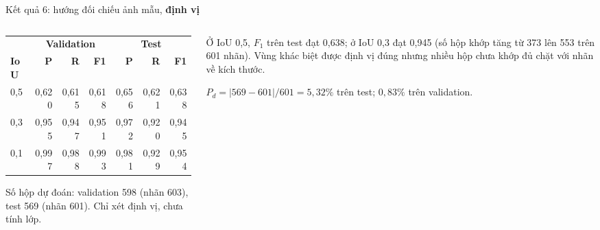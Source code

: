 \documentclass[aspectratio=169,11pt,t]{beamer}
\newcommand{\hl}[1]{{\bfseries\color{coral}#1}}
\newcommand{\hdr}[1]{{\bfseries\color{muted}#1}}
\newcommand{\mynote}[1]{{\color{muted}\footnotesize #1}}
\begin{document}
\begin{frame}{Kết quả 6: hướng đối chiếu ảnh mẫu, \hl{định vị}}
  \begin{columns}[T]
    \begin{column}{0.46\textwidth}
      \footnotesize
      \renewcommand{\arraystretch}{1.3}\setlength{\tabcolsep}{3pt}
      \begin{tabular}{@{}lrrrrrr@{}}
        \toprule
        & \multicolumn{3}{c}{\hdr{Validation}} & \multicolumn{3}{c}{\hdr{Test}} \\
        \cmidrule(lr){2-4}\cmidrule(l){5-7}
        \hdr{IoU} & \hdr{P} & \hdr{R} & \hdr{F1} & \hdr{P} & \hdr{R} & \hdr{F1} \\
        \midrule
        0,5 & 0,620 & 0,615 & 0,618 & 0,656 & 0,621 & 0,638 \\
        0,3 & 0,955 & 0,947 & 0,951 & 0,972 & 0,920 & 0,945 \\
        0,1 & 0,997 & 0,988 & 0,993 & 0,981 & 0,929 & 0,954 \\
        \bottomrule
      \end{tabular}
      \vspace{3pt}\par
      \mynote{Số hộp dự đoán: validation 598 (nhãn 603), test 569 (nhãn 601). Chỉ xét định vị, chưa tính lớp.}
    \end{column}
    \begin{column}{0.50\textwidth}
      \footnotesize
      \begin{key}
        Ở IoU 0,5, $F_1$ trên test đạt 0,638; ở IoU 0,3 đạt 0,945 (số hộp khớp tăng từ 373 lên 553 trên 601 nhãn). Vùng khác biệt được định vị đúng nhưng nhiều hộp chưa khớp đủ chặt với nhãn về kích thước.
      \end{key}
      \vspace{4pt}
      \begin{why}
        $P_d=|569-601|/601=5{,}32\%$ trên test; $0{,}83\%$ trên validation.
      \end{why}
    \end{column}
  \end{columns}
\end{frame}
\end{document}
